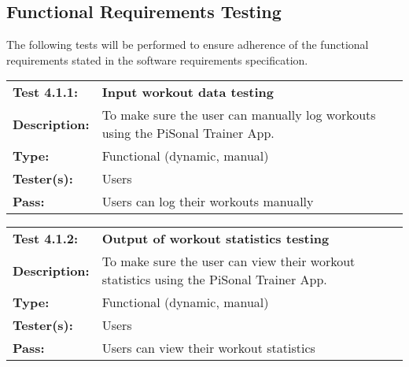 \documentclass{article}
\newenvironment{testcase}
    {
    \begin{center}
    \begin{mdframed}[
        userdefinedwidth=15.5cm,
        leftmargin=1cm,
        rightmargin=1cm
        ]
    \begin{tabular}{p{2.5cm} p{9cm}}
    }
    {
    \end{tabular}
    \end{mdframed}
    \end{center}
    }
\newcommand{\tctit}[2]{\textbf{#1} & \textbf{#2}}
\newcommand{\tcdesc}{\textbf{Description:}}
\newcommand{\tctype}{\textbf{Type:}}
\newcommand{\testers}{\textbf{Tester(s):}}
\newcommand{\tcpass}{\textbf{Pass:}}
\begin{document}
\subsection{Functional Requirements Testing}
The following tests will be performed to ensure adherence of the functional requirements stated in the software requirements specification. 
\begingroup
\begin{testcase}
    \tctit{Test 4.1.1:}{Input workout data testing} \\
    \tcdesc & To make sure the user can manually log workouts using the PiSonal Trainer App.\\
    \tctype & Functional (dynamic, manual)\\
    \testers & Users \\
    \tcpass & Users can log their workouts manually \\
\end{testcase}
\endgroup

\begingroup
\begin{testcase}
    \tctit{Test 4.1.2:}{Output of workout statistics testing} \\
    \tcdesc & To make sure the user can view their workout statistics using the PiSonal Trainer App.\\
    \tctype & Functional (dynamic, manual)\\
    \testers & Users \\
    \tcpass & Users can view their workout statistics \\
\end{testcase}
\endgroup
\end{document}

